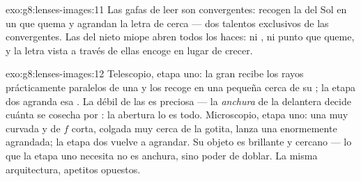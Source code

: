 \begin{solution}{exo:g8:lenses-images:11}
Las gafas de leer son convergentes: recogen la  del Sol en un 
que quema y agrandan la letra de cerca --- dos talentos exclusivos de
las convergentes. Las  del nieto miope abren
todos los haces: ni , ni punto que queme, y la letra vista a
través de ellas encoge en lugar de crecer.
\end{solution}

\begin{solution}{exo:g8:lenses-images:12}
Telescopio, etapa uno: la gran  recibe los rayos
prácticamente paralelos de una  y los recoge en una
pequeña  cerca de su ; la etapa dos agranda esa
. La  débil de las  es preciosa --- la
\emph{anchura} de la  delantera decide cuánta se cosecha por
: la abertura lo es todo. Microscopio, etapa uno: una
 muy curvada y de $f$ corta, colgada muy cerca de la gotita,
lanza una  enormemente agrandada; la etapa dos vuelve a
agrandar. Su objeto es brillante y cercano --- lo que la etapa uno
necesita no es anchura, sino poder de doblar. La misma arquitectura,
apetitos opuestos.
\end{solution}

